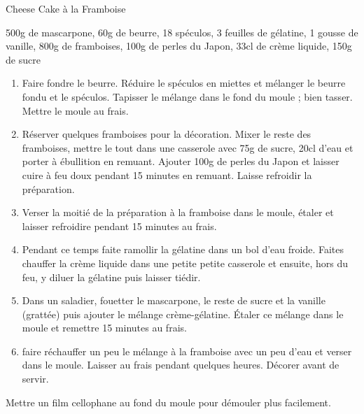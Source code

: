 \begin{recette}{Cheese Cake à la Framboise}
	\begin{ingredients}
			500g de mascarpone\sep
			60g de beurre\sep
			18 spéculos\sep
			3 feuilles de gélatine\sep
			1 gousse de vanille\sep
			800g de framboises\sep
			100g de perles du Japon\sep
			33cl de crème liquide\sep
			150g de sucre
	\end{ingredients}
	
	\begin{enumerate}
		\item Faire fondre le beurre. Réduire le spéculos en miettes et mélanger le beurre fondu et le spéculos. Tapisser le mélange dans le fond du moule ; bien tasser. Mettre le moule au frais.
		\item Réserver quelques framboises pour la décoration. Mixer le reste des framboises, mettre le tout dans une casserole avec 75g de sucre, 20cl d'eau et porter à ébullition en remuant. Ajouter 100g de perles du Japon et laisser cuire à feu doux pendant 15 minutes en remuant. Laisse refroidir la préparation.
		\item Verser la moitié de la préparation à la framboise dans le moule, étaler et laisser refroidire pendant 15 minutes au frais.
		\item Pendant ce temps faite ramollir la gélatine dans un bol d'eau froide. Faites chauffer la crème liquide dans une petite petite casserole et ensuite, hors du feu, y diluer la gélatine puis laisser tiédir.
		\item Dans un saladier, fouetter le mascarpone, le reste de sucre et la vanille (grattée) puis ajouter le mélange crème-gélatine. Étaler ce mélange dans le moule et remettre 15 minutes au frais.
		\item faire réchauffer un peu le mélange à la framboise avec un peu d'eau et verser dans le moule. Laisser au frais pendant quelques heures. Décorer avant de servir.
	\end{enumerate}
	 Mettre un film cellophane au fond du moule pour démouler plus facilement.
\end{recette}

